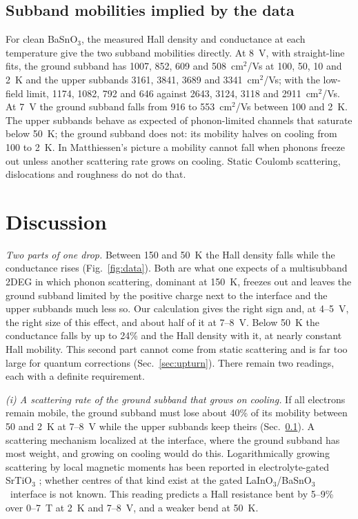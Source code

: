 \documentclass[11pt]{article}
\newcommand{\LIO}{\texorpdfstring{LaInO$_3$}{LaInO3}}
\newcommand{\BSO}{\texorpdfstring{BaSnO$_3$}{BaSnO3}}
\begin{document}
\subsection{Subband mobilities implied by the data}\label{sec:mob}
For clean \BSO, the measured Hall density and conductance at each temperature give the two subband mobilities directly. At 8~V, with straight-line fits, the ground subband has 1007, 852, 609 and 508~cm$^2$/Vs at 100, 50, 10 and 2~K and the upper subbands 3161, 3841, 3689 and 3341~cm$^2$/Vs; with the low-field limit, 1174, 1082, 792 and 646 against 2643, 3124, 3118 and 2911~cm$^2$/Vs. At 7~V the ground subband falls from 916 to 553~cm$^2$/Vs between 100 and 2~K. The upper subbands behave as expected of phonon-limited channels that saturate below 50~K; the ground subband does not: its mobility halves on cooling from 100 to 2~K. In Matthiessen's picture a mobility cannot fall when phonons freeze out unless another scattering rate grows on cooling. Static Coulomb scattering, dislocations and roughness do not do that.

\section{Discussion}\label{sec:disc}
\emph{Two parts of one drop.} Between 150 and 50~K the Hall density falls while the conductance rises (Fig.~\ref{fig:data}). Both are what one expects of a multisubband 2DEG in which phonon scattering, dominant at 150~K, freezes out and leaves the ground subband limited by the positive charge next to the interface and the upper subbands much less so. Our calculation gives the right sign and, at 4--5~V, the right size of this effect, and about half of it at 7--8~V. Below 50~K the conductance falls by up to 24\% and the Hall density with it, at nearly constant Hall mobility. This second part cannot come from static scattering and is far too large for quantum corrections (Sec.~\ref{sec:upturn}). There remain two readings, each with a definite requirement.

\emph{(i) A scattering rate of the ground subband that grows on cooling.} If all electrons remain mobile, the ground subband must lose about 40\% of its mobility between 50 and 2~K at 7--8~V while the upper subbands keep theirs (Sec.~\ref{sec:mob}). A scattering mechanism localized at the interface, where the ground subband has most weight, and growing on cooling would do this. Logarithmically growing scattering by local magnetic moments has been reported in electrolyte-gated SrTiO$_3$ \cite{LeeKondo2011}; whether centres of that kind exist at the gated \LIO/\BSO\ interface is not known. This reading predicts a Hall resistance bent by 5--9\% over 0--7~T at 2~K and 7--8~V, and a weaker bend at 50~K.
\end{document}
